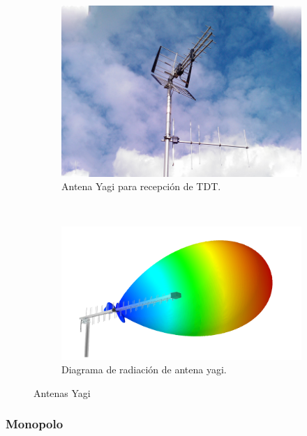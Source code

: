 \begin{figure}[h]
\centering
	\begin{subfigure}[b]{0.45\textwidth}
    \centering
        \includegraphics[width=\textwidth]{archivos/dipolo/yagi}
        \caption{Antena Yagi para recepción de TDT. \cite{Pearce2010}}
        \label{fig:yagi}
	\end{subfigure}
~ %
	\begin{subfigure}[b]{0.45\textwidth} %
	\centering
		\includegraphics[width=\textwidth]{archivos/yagipat} %
		\caption{Diagrama de radiación de antena yagi.}
		\label{fig:yagirad}
	\end{subfigure}
\caption{Antenas Yagi}\label{fig:yagis}
\end{figure}

\subsubsection{Monopolo}

